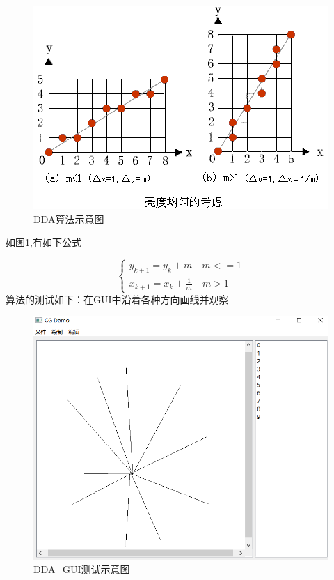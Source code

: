 \documentclass[a4paper,UTF8]{article}
\theoremstyle{definition}
\begin{document}
\begin{figure}[h]
	\centering
	\includegraphics[scale=1]{figure/DDA.png}
	\caption{DDA算法示意图}
	\label{fig:DDA}
\end{figure}

如图\ref{fig:DDA},有如下公式

$$
\begin{cases}
    y_{k+1}=y_k + m \quad \text{$m<=1$}\\
    x_{k+1}=x_k + \frac{1}{m} \quad \text{$m>1$}
\end{cases}
$$
算法的测试如下：在GUI中沿着各种方向画线并观察\\
\begin{figure}[h]
	\centering
	\includegraphics[scale=0.4]{figure/DDA_GUI.png}
	\caption{DDA\_GUI测试示意图}
	\label{fig:DDA_GUI}
\end{figure}
\end{document}
